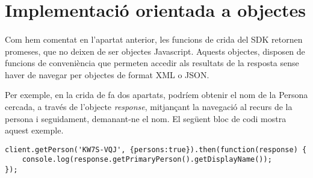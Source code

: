 \section{Implementació orientada a objectes}

    \paragraph{}
    Com hem comentat en l'apartat anterior, les funcions de crida del SDK retornen promeses, que no deixen de ser objectes Javascript. Aquests objectes, disposen de funcions de conveniència que permeten accedir als resultats de la resposta sense haver de navegar per objectes de format XML o JSON.

    Per exemple, en la crida de fa dos apartats, podríem obtenir el nom de la Persona cercada, a través de l’objecte \emph{response}, mitjançant la navegació al recurs de la persona i seguidament, demanant-ne el nom. El següent bloc de codi mostra aquest exemple.

\begin{lstlisting}[style=rawOwn,caption={Example navagació per l'objecte \emph{response}}]
client.getPerson('KW7S-VQJ', {persons:true}).then(function(response) {
    console.log(response.getPrimaryPerson().getDisplayName());
});
\end{lstlisting}
